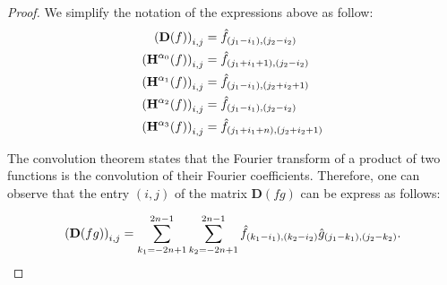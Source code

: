 \begin{proof}
We simplify the notation of the expressions above as follow:
\begin{align}
    \leftmat \mathbf{D}(f) \rightmat_{i, j} &= \hat{f}_{(j_1 - i_1), (j_2 - i_2 )} \\
    \leftmat \mathbf{H}^{\alpha_0}(f) \rightmat_{i, j} &= \hat{f}_{(j_1 + i_1 + 1), (j_2 - i_2 )} \\
    \leftmat \mathbf{H}^{\alpha_1}(f) \rightmat_{i, j} &= \hat{f}_{(j_1 - i_1), (j_2 + i_2 + 1)} \\
    \leftmat \mathbf{H}^{\alpha_2}(f) \rightmat_{i, j} &= \hat{f}_{(j_1 - i_1), (j_2 - i_2 )} \\
    \leftmat \mathbf{H}^{\alpha_3}(f) \rightmat_{i, j} &= \hat{f}_{(j_1 + i_1 + n), (j_2 + i_2 + 1)}
\end{align}


The convolution theorem states that the Fourier transform of a product of two functions is the convolution of their Fourier coefficients. Therefore, one can observe that the entry $(i, j)$ of the matrix $\mathbf{D}(f g)$ can be express as follows:

\begin{equation*}
    \leftmat \mathbf{D}(f g) \rightmat_{i, j} = \sum_{k_1 = -2n + 1}^{2n-1} \sum_{k_2 = -2n + 1}^{2n-1} \hat{f}_{(k_1-i_1),(k_2-i_2)} \hat{g}_{(j_1-k_1),(j_2-k_2)}. 
\end{equation*}


\end{proof}

